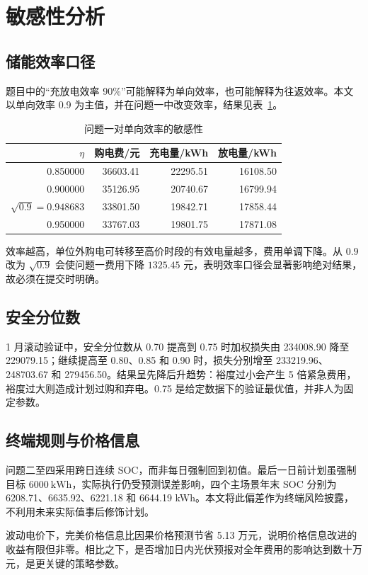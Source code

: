 \section{敏感性分析}

\subsection{储能效率口径}

题目中的“充放电效率 90\%”可能解释为单向效率，也可能解释为往返效率。本文以单向效率 0.9 为主值，并在问题一中改变效率，结果见表~\ref{tab:eta}。

\begin{table}[H]
\centering
\caption{问题一对单向效率的敏感性}
\label{tab:eta}
\begin{tabular}{rrrr}
\toprule
$\eta$ & 购电费/元 & 充电量/kWh & 放电量/kWh \\
\midrule
0.850000 & 36603.41 & 22295.51 & 16108.50 \\
0.900000 & 35126.95 & 20740.67 & 16799.94 \\
$\sqrt{0.9}=0.948683$ & 33801.50 & 19842.71 & 17858.44 \\
0.950000 & 33767.03 & 19801.75 & 17871.08 \\
\bottomrule
\end{tabular}
\end{table}

效率越高，单位外购电可转移至高价时段的有效电量越多，费用单调下降。从 $0.9$ 改为
$\sqrt{0.9}$ 会使问题一费用下降 $1325.45$ 元，表明效率口径会显著影响绝对结果，故必须在提交时明确。

\subsection{安全分位数}

1 月滚动验证中，安全分位数从 0.70 提高到 0.75 时加权损失由 234008.90 降至
229079.15；继续提高至 0.80、0.85 和 0.90 时，损失分别增至 233219.96、
248703.67 和 279456.50。结果呈先降后升趋势：裕度过小会产生 5 倍紧急费用，裕度过大则造成计划过购和弃电。0.75 是给定数据下的验证最优值，并非人为固定参数。

\subsection{终端规则与价格信息}

问题二至四采用跨日连续 SOC，而非每日强制回到初值。最后一日前计划虽强制目标
$6000~\mathrm{kWh}$，实际执行仍受预测误差影响，四个主场景年末 SOC 分别为
6208.71、6635.92、6221.18 和 6644.19 kWh。本文将此偏差作为终端风险披露，不利用未来实际值事后修饰计划。

波动电价下，完美价格信息比因果价格预测节省 5.13 万元，说明价格信息改进的收益有限但非零。相比之下，是否增加日内光伏预报对全年费用的影响达到数十万元，是更关键的策略参数。
